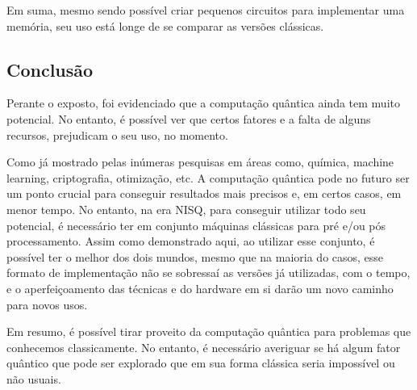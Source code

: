 \documentclass{article}
\begin{document}
Em suma, mesmo sendo possível criar pequenos circuitos para implementar uma memória, seu uso está longe de se comparar as versões clássicas.

\subsection{Conclusão}

Perante o exposto, foi evidenciado que a computação quântica ainda tem muito potencial. No entanto, é possível ver que certos fatores e a falta de alguns recursos, prejudicam o seu uso, no momento.

Como já mostrado pelas inúmeras pesquisas em áreas como, química, machine learning, criptografia, otimização, etc. A computação quântica pode no futuro ser um ponto crucial para conseguir resultados mais precisos e, em certos casos, em menor tempo. No entanto, na era NISQ, para conseguir utilizar todo seu potencial, é necessário ter em conjunto máquinas clássicas para pré e/ou pós processamento. Assim como demonstrado aqui, ao utilizar esse conjunto, é possível ter o melhor dos dois mundos, mesmo que na maioria do casos, esse formato de implementação não se sobressaí as versões já utilizadas, com o tempo, e o aperfeiçoamento das técnicas e do hardware em si darão um novo caminho para novos usos.

Em resumo, é possível tirar proveito da computação quântica para problemas que conhecemos classicamente. No entanto, é necessário averiguar se há algum fator quântico que pode ser explorado que em sua forma clássica seria impossível ou não usuais.

\nocite{SOARE2009368}
\nocite{odonnell_2015_lecture}
\nocite{bacon_2006_cse}
\nocite{lipics_stacs}
\nocite{odonnell_2015_lecture_2}
\nocite{brodkorb_2019_the}
\nocite{amreen_oracle}
\nocite{kalyanasyndaram_2021_mod04lec23}
\nocite{davis_2006_turing}
\nocite{viswanathan_2013_reductions}
\nocite{Fan_2007}
\nocite{cryptoeprint:2020/1270}
\nocite{buhrman1998quantum}
\nocite{sanchezrivero2023initial}
\nocite{gilliam2020canonical}
\nocite{Kashefi_2002}
\nocite{e21080800}
\nocite{Zeng_2014}
\nocite{atici2004comparative}
\nocite{sundarappan_2022_how}
\nocite{dai_view}
\nocite{sep-game-theory}
\nocite{Giovannetti_2008}
\nocite{jaques2023qram}
\nocite{PythonEWL2022}
\nocite{frackiewicz2011application}
\nocite{Eisert_1999}
\nocite{usman_2019_kilometres}
\nocite{ldiaandr_2021_tower}
\nocite{diptokarmakar47_2019_how}
\nocite{a2020_towers}
\nocite{geeksforgeeks_2014_program}
\nocite{khan_2021_quantum}
\nocite{legn_2022_dilemma}
\nocite{siegelwax_2022_quantum}
\nocite{landi_density}
\nocite{bacon_2006_cse}
\nocite{vijayakrishnan_2019_role}
\nocite{python_scientific}
\nocite{scipyoptimizeminimize_scalar}
\nocite{davis_optimization}
\nocite{scipyoptimizeminimize}





\end{document}
